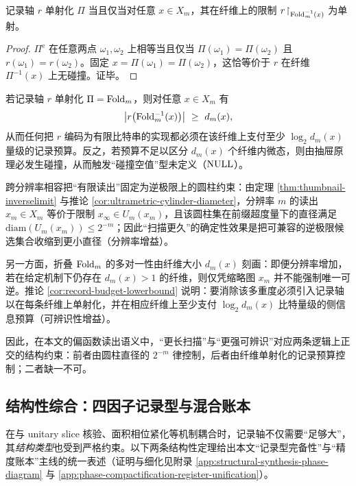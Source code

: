 \begin{proposition}[单射化的纤维判据]\label{prop:injectivization-fiber-criterion}
记录轴 $r$ 单射化 $\Pi$ 当且仅当对任意 $x\in X_m$，其在纤维上的限制
$
r\!\restriction_{\mathrm{Fold}_m^{-1}(x)}
$
为单射。
\end{proposition}

\begin{proof}
$\Pi^{\mathrm e}$ 在任意两点 $\omega_1,\omega_2$ 上相等当且仅当 $\Pi(\omega_1)=\Pi(\omega_2)$ 且 $r(\omega_1)=r(\omega_2)$。固定 $x=\Pi(\omega_1)=\Pi(\omega_2)$，这恰等价于 $r$ 在纤维 $\Pi^{-1}(x)$ 上无碰撞。证毕。
\end{proof}

\begin{corollary}\label{cor:record-budget-lowerbound}
若记录轴 $r$ 单射化 $\Pi=\mathrm{Fold}_m$，则对任意 $x\in X_m$ 有
$$
\card{r\!\left(\Fold_m^{-1}(x)\right)}\ \ge\ d_m(x),
$$
从而任何把 $r$ 编码为有限比特串的实现都必须在该纤维上支付至少 $\log_2 d_m(x)$ 量级的记录预算。反之，若预算不足以区分 $d_m(x)$ 个纤维内微态，则由抽屉原理必发生碰撞，从而触发“碰撞空值”型未定义（$\mathrm{NULL}$）。
\end{corollary}

\begin{remark}[分辨率增益与可辨识性增益的正交性]
跨分辨率相容把“有限读出”固定为逆极限上的圆柱约束：由定理 \ref{thm:thumbnail-inverselimit} 与推论 \ref{cor:ultrametric-cylinder-diameter}，分辨率 $m$ 的读出 $x_m\in X_m$ 等价于限制 $x_\infty\in U_m(x_m)$，且该圆柱集在前缀超度量下的直径满足 $\mathrm{diam}(U_m(x_m))\le 2^{-m}$；因此“扫描更久”的确定性效果是把可兼容的逆极限候选集合收缩到更小直径（分辨率增益）。\par
另一方面，折叠 $\mathrm{Fold}_m$ 的多对一性由纤维大小 $d_m(x)$ 刻画：即便分辨率增加，若在给定机制下仍存在 $d_m(x)>1$ 的纤维，则仅凭缩略图 $x_m$ 并不能强制唯一可逆。推论 \ref{cor:record-budget-lowerbound} 说明：要消除该多重度必须引入记录轴以在每条纤维上单射化，并在相应纤维上至少支付 $\log_2 d_m(x)$ 比特量级的侧信息预算（可辨识性增益）。\par
因此，在本文的偏函数读出语义中，“更长扫描”与“更强可辨识”对应两条逻辑上正交的结构约束：前者由圆柱直径的 $2^{-m}$ 律控制，后者由纤维单射化的记录预算控制；二者缺一不可。
\end{remark}

\subsection{结构性综合：四因子记录型与混合账本}\label{subsec:four-factor-mixed-ledger}
在与 unitary slice 核验、面积相位紧化等机制耦合时，记录轴不仅需要“足够大”，其\emph{结构类型}也受到严格约束。以下两条结构性定理给出本文“记录型完备性”与“精度账本”主线的统一表述（证明与细化见附录 \ref{app:structural-synthesis-phase-diagram} 与 \ref{app:phase-compactification-register-unification}）。\par

